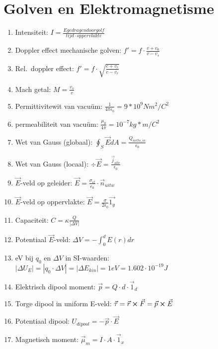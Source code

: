 \documentclass[12pt]{article}
\begin{document}
    \maketitle

    \section{Golven en Elektromagnetisme}%
    \label{sec:section_name}
    
    \begin{enumerate}
	    \item Intensiteit: $ I = \frac{E gedragen door golf}{tijd \cdot oppervlakte}$ 
	    \item Doppler effect mechanische golven: $ f' = f \cdot \frac{v+v_0}{v-v_s}$
	    \item Rel.\ doppler effect: $ f' = f \cdot \sqrt{\frac{c+v_r}{c-v_r}} $
	    \item Mach getal:  $ M = \frac{v_s}{v} $
	    \item Permittivitewit van vacu\"um: $ \frac{1}{4\pi\epsilon_0} = 9* 10^9 Nm^2/C^2 $
	    \item permeabiliteit van vacu\"um: $ \frac{\mu_0}{4\pi} = 10^{-7} kg*m/C^2 $
	    \item Wet van Gauss (globaal): $ \oint_S \vec{E} dA = \frac{Q_{netto,in}}{\epsilon_0} $
	    \item Wet van Gauss (locaal): $ \div \vec{E} = \frac{ \vec{j}_{alle}}{\epsilon_0} $
	    \item $ \vec{E}$-veld op geleider: $ \vec{E} = \frac{\sigma_{el}}{\epsilon_0} \cdot \vec{n}_{uitw} $
	    \item $ \vec{E}$-veld op oppervlakte: $ \vec{E} = \frac{\sigma}{2 \epsilon_0} \vec{1_y} $
	    \item Capaciteit: $ C = \kappa \frac{Q}{|\Delta V|} $
	    \item Potentiaal $ \vec{E}$-veld: $ \Delta V = -\int_0^d E(r) dr $
	    \item eV bij $q_0$ en $\Delta V$ in SI-waarden:  $|\Delta U_E| = |q_0 \cdot \Delta V| = |\Delta E_{kin}| = 1 eV = 1.602 \cdot 10^{-19} J $
	    \item Elektrisch dipool moment: $ \vec{p} = Q \cdot d \cdot \vec{1}_d $
	    \item Torge dipool in uniform E-veld: $ \vec{\tau} = \vec{r}\cross\vec{F} = \vec{p} \cross \vec{E} $
	    \item Potentiaal dipool: $ U_{dipool} = - \vec{p} \cdot \vec{E} $
	    \item Magnetisch moment: $ \vec{\mu}_m = I \cdot A \cdot \vec{1}_x $

\end{enumerate}
\end{document}
